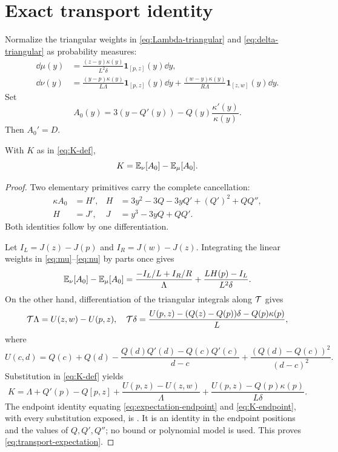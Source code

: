 \section{Exact transport identity}\label{sec:transport}

Normalize the triangular weights in \eqref{eq:Lambda-triangular} and
\eqref{eq:delta-triangular} as probability measures:
\begin{align}
 \dd\mu(y)&=\frac{(z-y)\kappa(y)}{L^2\delta}
 \mathbf1_{[p,z]}(y)\dd y,\label{eq:mu}\\
 \dd\nu(y)&=\frac{(y-p)\kappa(y)}{L\Lambda}
 \mathbf1_{[p,z]}(y)\dd y
 +\frac{(w-y)\kappa(y)}{R\Lambda}
 \mathbf1_{[z,w]}(y)\dd y.
 \label{eq:nu}
\end{align}
Set
\[
 A_0(y)=3(y-Q'(y))-Q(y)\frac{\kappa'(y)}{\kappa(y)}.
\]
Then \(A_0'=D\).

\begin{lemma}\label{lem:transport}
With \(K\) as in \eqref{eq:K-def},
\begin{equation}\label{eq:transport-expectation}
 K=\mathbb{E}_\nu[A_0]-\mathbb{E}_\mu[A_0].
\end{equation}
\end{lemma}

\begin{proof}
Two elementary primitives carry the complete cancellation:
\begin{align}
 \kappa A_0&=H',& H&=3y^2-3Q-3yQ'+(Q')^2+QQ'',\label{eq:H}\\
 H&=J',& J&=y^3-3yQ+QQ'.\label{eq:J}
\end{align}
Both identities follow by one differentiation.

Let \(I_L=J(z)-J(p)\) and \(I_R=J(w)-J(z)\). Integrating the linear weights
in \eqref{eq:mu}--\eqref{eq:nu} by parts once gives
\begin{equation}\label{eq:expectation-endpoint}
 \mathbb{E}_\nu[A_0]-\mathbb{E}_\mu[A_0]
 =\frac{-I_L/L+I_R/R}{\Lambda}
 +\frac{LH(p)-I_L}{L^2\delta}.
\end{equation}
On the other hand, differentiation of the triangular integrals along \(\mathcal{T}\)
gives
\[
 \mathcal{T}\Lambda=U(z,w)-U(p,z),
\quad
 \mathcal{T}\delta=\frac{U(p,z)-(Q(z)-Q(p))\delta-Q(p)\kappa(p)}L,
\]
where
\begin{equation}\label{eq:U-endpoint}
 U(c,d)=Q(c)+Q(d)-\frac{Q(d)Q'(d)-Q(c)Q'(c)}{d-c}
 +\frac{(Q(d)-Q(c))^2}{(d-c)^2}.
\end{equation}
Substitution in \eqref{eq:K-def} yields
\begin{equation}\label{eq:K-endpoint}
 K=\Lambda+Q'(p)-Q[p,z]
 +\frac{U(p,z)-U(z,w)}{\Lambda}
 +\frac{U(p,z)-Q(p)\kappa(p)}{L\delta}.
\end{equation}
The endpoint identity equating \eqref{eq:expectation-endpoint} and
\eqref{eq:K-endpoint}, with every substitution exposed, is
. It is an identity in the endpoint positions and the
values of \(Q,Q',Q''\); no bound or polynomial model is used. This proves
\eqref{eq:transport-expectation}.
\end{proof}

